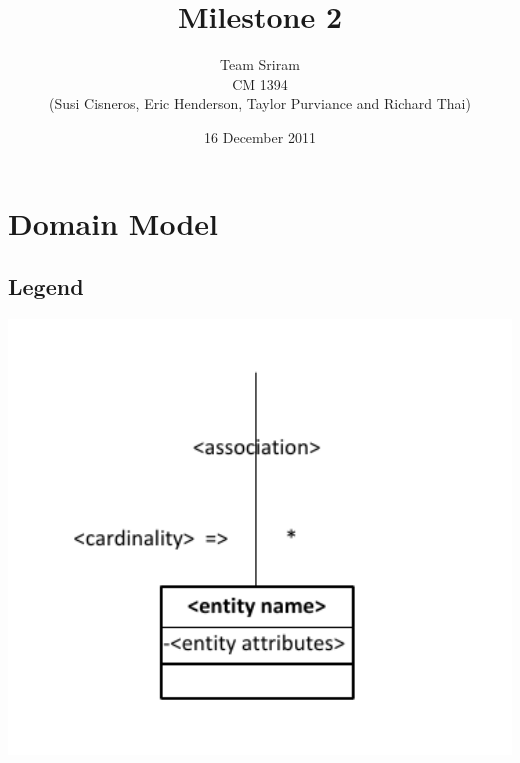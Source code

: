 \documentclass{article}
\begin{document}
\setlength{\voffset}{3.5in}
\title{Milestone 2}
\author{Team Sriram\\
CM 1394\\
(Susi Cisneros, Eric Henderson, Taylor Purviance and Richard Thai)}
\date{16 December 2011}
\maketitle
\clearpage
\setlength{\voffset}{0pt}
\section{Domain Model}

\subsection{Legend}
\includegraphics[keepaspectratio, width=6in]{domain_model_legend.pdf}\\
\end{document}
